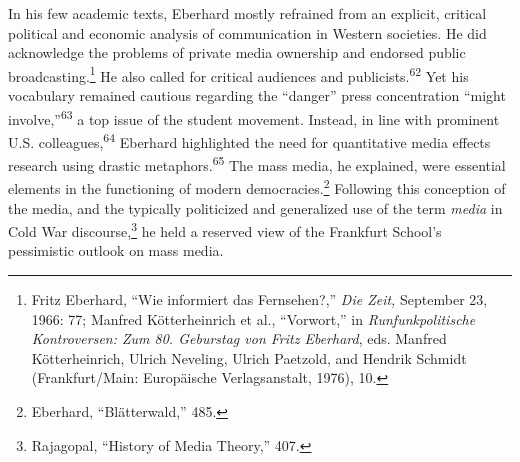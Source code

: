 \documentclass{tufte-handout}
\begin{document}
In his few academic texts, Eberhard mostly refrained from an explicit,
critical political and economic analysis of communication in Western
societies. He did acknowledge the problems of private media ownership
and endorsed public broadcasting.\footnote{Fritz Eberhard, ``Wie
  informiert das Fernsehen?,'' \emph{Die Zeit,} September 23, 1966: 77;
  Manfred Kötterheinrich et al., ``Vorwort,'' in \emph{Runfunkpolitische
  Kontroversen: Zum 80. Geburstag von Fritz Eberhard}, eds. Manfred
  Kötterheinrich, Ulrich Neveling, Ulrich Paetzold, and Hendrik Schmidt
  (Frankfurt/Main: Europäische Verlagsanstalt, 1976), 10.} He also
called for critical audiences and publicists.\textsuperscript{62} Yet his vocabulary remained cautious regarding the
``danger'' press concentration ``might involve,''\textsuperscript{63} a top issue of the student movement. Instead, in line with
prominent U.S. colleagues,\textsuperscript{64}
Eberhard highlighted the need for quantitative media effects research
using drastic metaphors.\textsuperscript{65} The
mass media, he explained, were essential elements in the functioning of
modern democracies.\footnote{Eberhard, ``Blätterwald,'' 485.} Following
this conception of the media, and the typically politicized and
generalized use of the term \emph{media} in Cold War
discourse,\footnote{Rajagopal, ``History of Media Theory,'' 407.} he
held a reserved view of the Frankfurt School's pessimistic outlook on
mass media.

 \enlargethispage{-\baselineskip}
 
\end{document}
